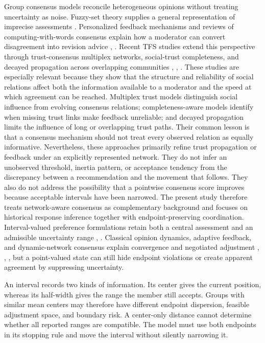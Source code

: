 \documentclass[journal]{IEEEtran}
\begin{document}
Group consensus models reconcile heterogeneous opinions without treating uncertainty as noise. Fuzzy-set theory supplies a general representation of imprecise assessments \cite{ref1}. Personalized feedback mechanisms and reviews of computing-with-words consensus explain how a moderator can convert disagreement into revision advice \cite{ref6}, \cite{ref25}. Recent TFS studies extend this perspective through trust-consensus multiplex networks, social-trust completeness, and decayed propagation across overlapping communities \cite{tfsWu2022}, \cite{tfsLiu2023}, \cite{tfsJi2024}. These studies are especially relevant because they show that the structure and reliability of social relations affect both the information available to a moderator and the speed at which agreement can be reached. Multiplex trust models distinguish social influence from evolving consensus relations; completeness-aware models identify when missing trust links make feedback unreliable; and decayed propagation limits the influence of long or overlapping trust paths. Their common lesson is that a consensus mechanism should not treat every observed relation as equally informative. Nevertheless, these approaches primarily refine trust propagation or feedback under an explicitly represented network. They do not infer an unobserved threshold, inertia pattern, or acceptance tendency from the discrepancy between a recommendation and the movement that follows. They also do not address the possibility that a pointwise consensus score improves because acceptable intervals have been narrowed. The present study therefore treats network-aware consensus as complementary background and focuses on historical response inference together with endpoint-preserving coordination. Interval-valued preference formulations retain both a central assessment and an admissible uncertainty range \cite{ref16}, \cite{ref17}. Classical opinion dynamics, adaptive feedback, and dynamic-network consensus explain convergence and negotiated adjustment \cite{ref2}, \cite{ref21}, \cite{ref27}, but a point-valued state can still hide endpoint violations or create apparent agreement by suppressing uncertainty.

An interval records two kinds of information. Its center gives the current position, whereas its half-width gives the range the member still accepts. Groups with similar mean centers may therefore have different endpoint dispersion, feasible adjustment space, and boundary risk. A center-only distance cannot determine whether all reported ranges are compatible. The model must use both endpoints in its stopping rule and move the interval without silently narrowing it.
\end{document}
